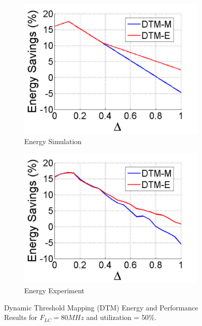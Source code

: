 \begin{figure}[!t]
\begin{subfigure}{.5\columnwidth}
		\includegraphics[width=\columnwidth]{./figures/flc_80_delta_energy_theory}
		\caption{Energy Simulation}
		\label{fig:Flc80-delta-energy-theory}
	\end{subfigure}
	\begin{subfigure}{.5\columnwidth}
		\centering
		\includegraphics[width=\columnwidth]{./figures/flc_80_delta_energy}
		\caption{Energy Experiment}
		\label{fig:Flc80-delta-energy}
	\end{subfigure}
	\caption{Dynamic Threshold Mapping (DTM) Energy and Performance Results for $F_{LC} = 80 MHz$ and utilization = 50\%.}
	\label{fig:Flc80-delta}
\end{figure}